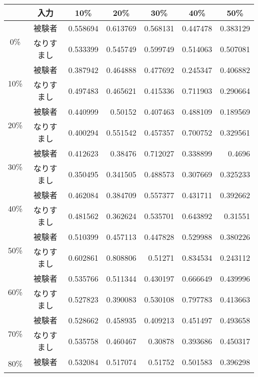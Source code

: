 \begin{center}
  \begin{longtable}[btph]{|c|c|r|r|r|r|r|}
    \hline
      \multicolumn{1}{|c|}{} & \multicolumn{1}{c|}{入力} & \multicolumn{1}{c|}{10\%} & \multicolumn{1}{c|}{20\%} & \multicolumn{1}{c|}{30\%} & \multicolumn{1}{c|}{40\%} & \multicolumn{1}{c|}{50\%} \\ \hline
      \multirow{2}{*}{0\%}  & 被験者 & 0.558694 & 0.613769 & 0.568131 & 0.447478 & 0.383129 \\ \cline{2-7}
           & なりすまし & 0.533399 & 0.545749 & 0.599749 & 0.514063 & 0.507081 \\ \hline
      \multirow{2}{*}{10\%} & 被験者 & 0.387942 & 0.464888 & 0.477692 & 0.245347 & 0.406882 \\ \cline{2-7}
           & なりすまし & 0.497483 & 0.465621 & 0.415336 & 0.711903 & 0.290664 \\ \hline
      \multirow{2}{*}{20\%} & 被験者 & 0.440999 & 0.50152 & 0.407463 & 0.488109 & 0.189569 \\ \cline{2-7}
           & なりすまし & 0.400294 & 0.551542 & 0.457357 & 0.700752 & 0.329561 \\ \hline
      \multirow{2}{*}{30\%} & 被験者 & 0.412623 & 0.38476 & 0.712027 & 0.338899 & 0.4696 \\ \cline{2-7}
           & なりすまし & 0.350495 & 0.341505 & 0.488573 & 0.307669 & 0.325233 \\ \hline
      \multirow{2}{*}{40\%} & 被験者 & 0.462084 & 0.384709 & 0.557377 & 0.431711 & 0.392662 \\ \cline{2-7}
           & なりすまし & 0.481562 & 0.362624 & 0.535701 & 0.643892 & 0.31551 \\ \hline
      \multirow{2}{*}{50\%} & 被験者 & 0.510399 & 0.457113 & 0.447828 & 0.529988 & 0.380226 \\ \cline{2-7}
           & なりすまし & 0.602861 & 0.808806 & 0.51271 & 0.834534 & 0.243112 \\ \hline
      \multirow{2}{*}{60\%} & 被験者 & 0.535766 & 0.511344 & 0.430197 & 0.666649 & 0.439996 \\ \cline{2-7}
           & なりすまし & 0.527823 & 0.390083 & 0.530108 & 0.797783 & 0.413663 \\ \hline
      \multirow{2}{*}{70\%} & 被験者 & 0.528662 & 0.458935 & 0.409213 & 0.451497 & 0.493658 \\ \cline{2-7}
           & なりすまし & 0.535758 & 0.460467 & 0.30878 & 0.393686 & 0.450317 \\ \hline
      \multirow{2}{*}{80\%} & 被験者 & 0.532084 & 0.517074 & 0.51752 & 0.501583 & 0.396298 \\ \cline{2-7}

\end{longtable}
\end{center}
